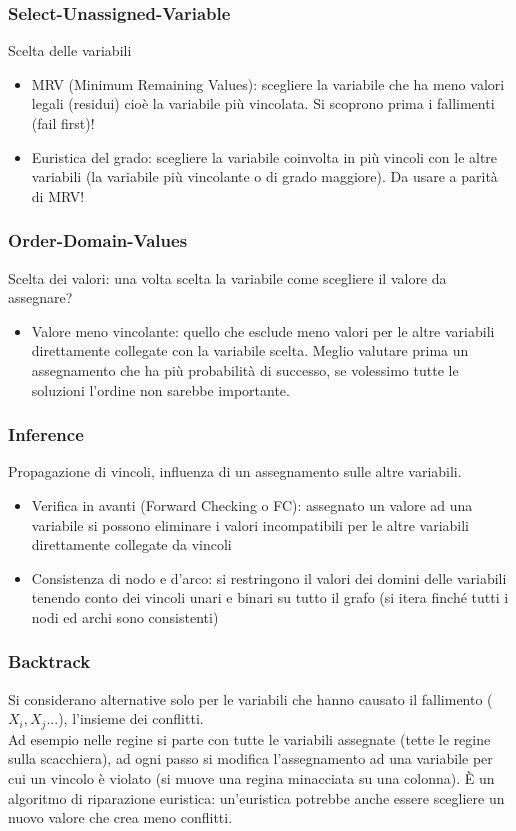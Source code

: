 \documentclass{article}
\begin{document}
\subsubsection{Select-Unassigned-Variable}
Scelta delle variabili
\begin{itemize}
    \item MRV (Minimum Remaining Values): scegliere la variabile che ha meno valori legali (residui) cioè la variabile più vincolata. Si scoprono prima i fallimenti (fail first)!
    \item Euristica del grado: scegliere la variabile coinvolta in più vincoli con le altre variabili (la variabile più vincolante o di grado maggiore). Da usare a parità di MRV!
\end{itemize}

\subsubsection{Order-Domain-Values}
Scelta dei valori: una volta scelta la variabile come scegliere il valore da assegnare?
\begin{itemize}
    \item Valore meno vincolante: quello che esclude meno valori per le altre variabili direttamente collegate con la variabile scelta. Meglio valutare prima un assegnamento che ha più probabilità di successo, se volessimo tutte le soluzioni l’ordine non sarebbe importante.
\end{itemize}

\subsubsection{Inference}
Propagazione di vincoli, influenza di un assegnamento sulle altre variabili.
\begin{itemize}
    \item Verifica in avanti (Forward Checking o FC): assegnato un valore ad una variabile si possono eliminare i valori incompatibili per le altre variabili direttamente collegate da vincoli
    \item Consistenza di nodo e d’arco: si restringono il valori dei domini delle variabili tenendo conto dei vincoli unari e binari su tutto il grafo (si itera finché tutti i nodi ed archi sono consistenti)
\end{itemize}

\subsubsection{Backtrack}
Si considerano alternative solo per le variabili che hanno causato il fallimento ($X_i, X_j ...$), l’insieme dei conflitti. \\
Ad esempio nelle regine si parte con tutte le variabili assegnate (tette le regine sulla scacchiera), ad ogni passo si modifica l’assegnamento ad una variabile per cui un vincolo è violato (si muove una regina minacciata su una colonna).
È un algoritmo di riparazione euristica: un’euristica potrebbe anche essere scegliere un nuovo valore che crea meno conflitti.
\end{document}
